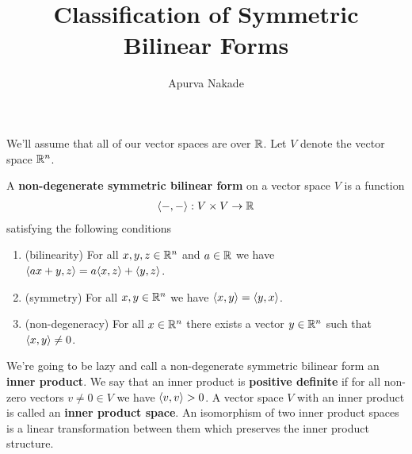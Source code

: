 \iffalse
Noether's theorem says that continuous symmetries of physical systems gives rise to conservation laws. In this class we'll see some examples of low dimensional Lie groups and how they give rise to various phenomenon in physics like time dilation and length contraction in special relativity, spin states of electrons.

Keywords: bilinear forms, signature, SO(2), SO(3), Spin, SO(1,3), Minkowski space and relativity, Noether's theorem, Lie groups.

Prereqs: Linear algebra, Group theory
Homework: Recommended
\fi


\usepackage{manfnt}

\DeclareMathOperator{\aut}{Aut}
\DeclareMathOperator{\gl}{GL}
\DeclareMathOperator{\sL}{SL}
\DeclareMathOperator{\sign}{sign}



\title{Classification of Symmetric Bilinear Forms}
\author{Apurva Nakade}
\thispagestyle{fancy}
\maketitle


We'll assume that all of our vector spaces are over $\mathbb{R}$. Let $V$ denote the vector space $\mathbb{R}^n$.
\begin{definition}
	A \textbf{non-degenerate symmetric bilinear form} on a vector space $V$ is a function
	\begin{align}
		\langle -, - \rangle: V \times V \rightarrow \mathbb{R}
	\end{align}
	satisfying the following conditions
	\begin{enumerate}
		\item (bilinearity) For all $x,y,z \in \mathbb{R}^n$ and $a \in \mathbb{R}$ we have $\langle ax+y, z \rangle = a\langle x, z \rangle + \langle y, z \rangle$.
		\item (symmetry) For all $x,y\in \mathbb{R}^n$ we have $\langle x, y \rangle = \langle y, x \rangle$.
		\item (non-degeneracy) For all $x \in \mathbb{R}^n$ there exists a vector $y \in \mathbb{R}^n$ such that $\langle x, y \rangle \neq 0$.
	\end{enumerate}
	We're going to be lazy and call a non-degenerate symmetric bilinear form an \textbf{inner product}. We say that an inner product is \textbf{positive definite} if for all non-zero vectors $v \neq 0 \in V$ we have $\langle v, v \rangle > 0$. A vector space $V$ with an inner product is called an \textbf{inner product space}. An isomorphism of two inner product spaces is a linear transformation between them which preserves the inner product structure.
\end{definition}

